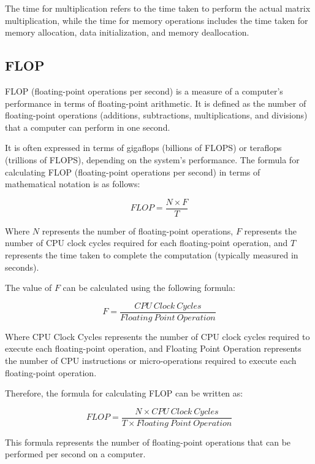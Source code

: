 \documentclass[conference]{IEEEtran}
\begin{document}
	
	The time for multiplication refers to the time taken to perform the actual matrix multiplication, while the time for memory operations includes the time taken for memory allocation, data initialization, and memory deallocation.
	
	\subsection{FLOP} 
	
	FLOP (floating-point operations per second) is a measure of a computer's performance in terms of floating-point arithmetic. It is defined as the number of floating-point operations (additions, subtractions, multiplications, and divisions) that a computer can perform in one second.
	
	It is often expressed in terms of gigaflops (billions of FLOPS) or teraflops (trillions of FLOPS), depending on the system's performance. The formula for calculating FLOP (floating-point operations per second) in terms of mathematical notation is as follows:
	
	\begin{equation}
		FLOP = \frac{N \times F}{T}
	\end{equation}
	
	
	Where $N$ represents the number of floating-point operations, $F$ represents the number of CPU clock cycles required for each floating-point operation, and $T$ represents the time taken to complete the computation (typically measured in seconds).
	
	The value of $F$ can be calculated using the following formula:
	
	\begin{equation}
		F = \frac{CPU \ Clock \ Cycles}{Floating \ Point \ Operation}
	\end{equation}
	
	
	Where CPU Clock Cycles represents the number of CPU clock cycles required to execute each floating-point operation, and Floating Point Operation represents the number of CPU instructions or micro-operations required to execute each floating-point operation.
	
	Therefore, the formula for calculating FLOP can be written as:
	
	\begin{equation}
		FLOP = \frac{N \times CPU \ Clock \ Cycles}{T \times Floating \ Point \ Operation}
	\end{equation}
	
	
	This formula represents the number of floating-point operations that can be performed per second on a computer.
	
\end{document}
